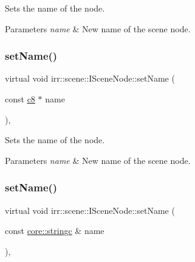 Sets the name of the node. 


\begin{DoxyParams}{Parameters}
{\em name} & New name of the scene node. \\
\hline
\end{DoxyParams}
\mbox{\label{classirr_1_1scene_1_1ISceneNode_a810a54a2fc178b9a0e731513865f67d0}} 
\subsubsection{\texorpdfstring{set\+Name()}{setName()}\hspace{0.1cm}{\footnotesize\ttfamily [2/4]}}
{\footnotesize\ttfamily virtual void irr\+::scene\+::\+I\+Scene\+Node\+::set\+Name (\begin{DoxyParamCaption}\item[{const \hyperlink{namespaceirr_a9395eaea339bcb546b319e9c96bf7410}{c8} $\ast$}]{name }\end{DoxyParamCaption})\hspace{0.3cm}{\ttfamily [inline]}, {\ttfamily [virtual]}}



Sets the name of the node. 


\begin{DoxyParams}{Parameters}
{\em name} & New name of the scene node. \\
\hline
\end{DoxyParams}
\mbox{\label{classirr_1_1scene_1_1ISceneNode_a20a22d956974f4817a20663361f20042}} 
\subsubsection{\texorpdfstring{set\+Name()}{setName()}\hspace{0.1cm}{\footnotesize\ttfamily [3/4]}}
{\footnotesize\ttfamily virtual void irr\+::scene\+::\+I\+Scene\+Node\+::set\+Name (\begin{DoxyParamCaption}\item[{const \hyperlink{namespaceirr_1_1core_ab26a0e0359206b5a694f35c37c829d7f}{core\+::stringc} \&}]{name }\end{DoxyParamCaption})\hspace{0.3cm}{\ttfamily [inline]}, {\ttfamily [virtual]}}



